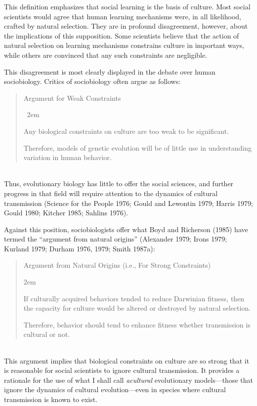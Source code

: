 \documentclass[11pt]{article}
\begin{document}
This definition emphasizes that social learning is the basis of culture.  Most
social scientists would agree that human learning mechanisms were, in all
likelihood, crafted by natural selection.  They are in profound
disagreement, however, about the implications of this supposition.  Some
scientists believe that the action of natural selection on learning
mechanisms constrains culture in important ways, while others are convinced
that any such constraints are negligible.

This disagreement is most clearly displayed in the debate over human
sociobiology.  Critics of sociobiology often argue as follows:\\
\begin{minipage}{\textwidth}
\begin{quote}
Argument for Weak Constraints
\begin{list}{\ }{\leftmargin 2em}
\item[1.1]  Any biological constraints on culture are too weak to be
significant. 
\item[1.2] Therefore, models of genetic evolution will be of little use in
understanding variation in human behavior.
\end{list}
\end{quote}
\end{minipage}\\[1.5ex]
Thus, evolutionary biology has little to offer the social sciences, and
further progress in that field will require attention to the dynamics of
cultural transmission (Science for the People 1976; Gould and Lewontin
1979; Harris 1979; Gould 1980; Kitcher 1985; Sahlins 1976).

Against this position, sociobiologists offer what Boyd and
Richerson (1985) have termed the ``argument from natural origins''
(Alexander 1979; Irons 1979; Kurland 1979; Durham 1976, 1979; Smith
1987a):\\[1.5ex]
\begin{minipage}{\textwidth}
\begin{quote}
Argument from Natural Origins (i.e., For Strong Constraints)
\begin{list}{}{\leftmargin 2em}
\item[2.1] If culturally acquired behaviors tended to reduce Darwinian
fitness, then the capacity for culture would be altered or destroyed by
natural selection. 
\item[2.2] Therefore, behavior should tend to enhance fitness whether
transmission is cultural or not.
\end{list}
\end{quote}
\end{minipage}\\[1.5ex]
This argument implies that biological constraints on culture are so strong
that it is reasonable for social scientists to ignore cultural
transmission.  It provides a rationale for the use of what I shall call
\emph{acultural} evolutionary models---those that ignore the dynamics of
cultural evolution---even in species where cultural transmission is known
to exist.
\end{document}
